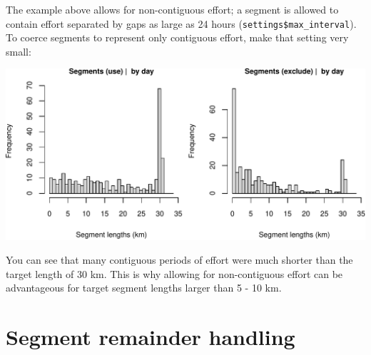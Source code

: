 \documentclass[
]{book}
\newenvironment{Shaded}{\begin{snugshade}}{\end{snugshade}}
\newcommand{\AttributeTok}[1]{\textcolor[rgb]{0.77,0.63,0.00}{#1}}
\newcommand{\CommentTok}[1]{\textcolor[rgb]{0.56,0.35,0.01}{\textit{#1}}}
\newcommand{\ConstantTok}[1]{\textcolor[rgb]{0.00,0.00,0.00}{#1}}
\newcommand{\DecValTok}[1]{\textcolor[rgb]{0.00,0.00,0.81}{#1}}
\newcommand{\FunctionTok}[1]{\textcolor[rgb]{0.00,0.00,0.00}{#1}}
\newcommand{\NormalTok}[1]{#1}
\newcommand{\OtherTok}[1]{\textcolor[rgb]{0.56,0.35,0.01}{#1}}
\newcommand{\SpecialCharTok}[1]{\textcolor[rgb]{0.00,0.00,0.00}{#1}}
\newcommand{\StringTok}[1]{\textcolor[rgb]{0.31,0.60,0.02}{#1}}
\begin{document}
The example above allows for non-contiguous effort; a segment is allowed to contain effort separated by gaps as large as 24 hours (\texttt{settings\$max\_interval}). To coerce segments to represent only contiguous effort, make that setting very small:

\begin{Shaded}
\end{Shaded}

\includegraphics{figures/unnamed-chunk-402-1.pdf}

You can see that many contiguous periods of effort were much shorter than the target length of 30 km. This is why allowing for non-contiguous effort can be advantageous for target segment lengths larger than 5 - 10 km.

\hypertarget{segment-remainder-handling}{%
\section*{Segment remainder handling}\label{segment-remainder-handling}}
\end{document}
